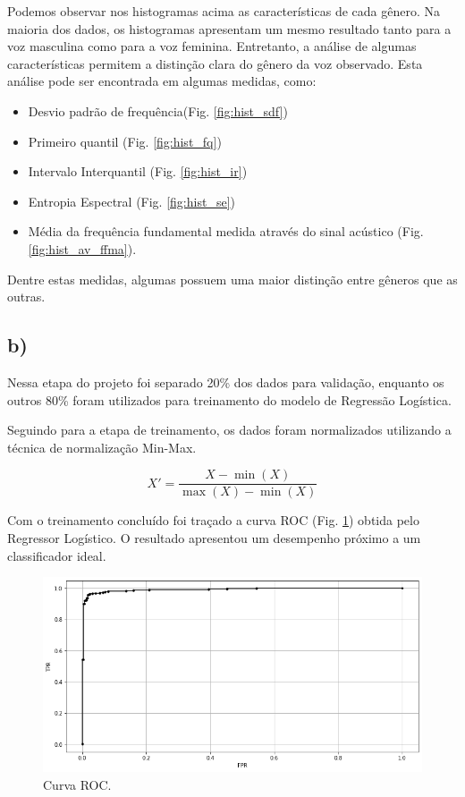 \documentclass[12pt]{article}
\begin{document}
\pagebreak
Podemos observar nos histogramas acima as características de cada gênero. Na maioria dos dados, os histogramas apresentam um mesmo resultado tanto para a voz masculina como para a voz feminina. Entretanto, a análise de algumas características permitem a distinção clara do gênero da voz observado. Esta análise pode ser encontrada em algumas medidas, como: 
\begin{itemize}
	\item Desvio padrão de frequência(Fig. \ref{fig:hist_sdf})
	
	\item Primeiro quantil (Fig. \ref{fig:hist_fq})
	
	\item Intervalo Interquantil (Fig. \ref{fig:hist_ir})
	
	\item Entropia Espectral (Fig. \ref{fig:hist_se})
	
	\item Média da frequência fundamental medida através do sinal acústico (Fig. \ref{fig:hist_av_ffma}).
		
\end{itemize}

Dentre estas medidas, algumas possuem uma maior distinção entre gêneros que as outras.


\subsection*{b)}
Nessa etapa do projeto foi separado 20\% dos dados para  validação, enquanto os outros 80\% foram utilizados para treinamento do modelo de Regressão Logística.

Seguindo para a etapa de treinamento, os dados foram normalizados utilizando a técnica de normalização Min-Max.

\begin{equation}
	X' = \frac{X - \min(X)}{\max(X)-\min(X)}
\end{equation}

Com o treinamento concluído foi traçado a curva ROC (Fig. \ref{fig:roc_curve}) obtida pelo Regressor Logístico. O resultado apresentou um desempenho próximo a um classificador ideal.

\begin{figure}[h!]
	\centering
	\includegraphics[width=\linewidth]{images/roc_curve.png}
	\caption{Curva ROC.}
	\label{fig:roc_curve}
\end{figure}
\end{document}
